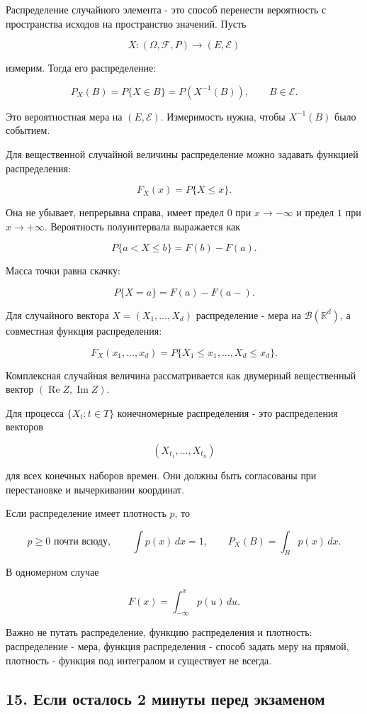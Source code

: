 \documentclass[
  11pt,
  a4paper,
]{article}
\begin{document}
Распределение случайного элемента - это способ перенести вероятность с
пространства исходов на пространство значений. Пусть

\[
X:(\Omega,\mathcal F,P)\to(E,\mathcal E)
\]

измерим. Тогда его распределение:

\[
P_X(B)=P\{X\in B\}=P(X^{-1}(B)),\qquad B\in\mathcal E.
\]

Это вероятностная мера на \((E,\mathcal E)\). Измеримость нужна, чтобы
\(X^{-1}(B)\) было событием.

Для вещественной случайной величины распределение можно задавать
функцией распределения:

\[
F_X(x)=P\{X\le x\}.
\]

Она не убывает, непрерывна справа, имеет предел \(0\) при
\(x\to-\infty\) и предел \(1\) при \(x\to+\infty\). Вероятность
полуинтервала выражается как

\[
P\{a<X\le b\}=F(b)-F(a).
\]

Масса точки равна скачку:

\[
P\{X=a\}=F(a)-F(a-).
\]

Для случайного вектора \(X=(X_1,\ldots,X_d)\) распределение - мера на
\(\mathcal B(\mathbb R^d)\), а совместная функция распределения:

\[
F_X(x_1,\ldots,x_d)
=
P\{X_1\le x_1,\ldots,X_d\le x_d\}.
\]

Комплексная случайная величина рассматривается как двумерный
вещественный вектор \((\operatorname{Re}Z,\operatorname{Im}Z)\).

Для процесса \(\{X_t:t\in T\}\) конечномерные распределения - это
распределения векторов

\[
(X_{t_1},\ldots,X_{t_n})
\]

для всех конечных наборов времен. Они должны быть согласованы при
перестановке и вычеркивании координат.

Если распределение имеет плотность \(p\), то

\[
p\ge0\text{ почти всюду},\qquad
\int p(x)\,dx=1,\qquad
P_X(B)=\int_Bp(x)\,dx.
\]

В одномерном случае

\[
F(x)=\int_{-\infty}^{x}p(u)\,du.
\]

Важно не путать распределение, функцию распределения и плотность:
распределение - мера, функция распределения - способ задать меру на
прямой, плотность - функция под интегралом и существует не всегда.

\subsection{15. Если осталось 2 минуты перед
экзаменом}\label{ux435ux441ux43bux438-ux43eux441ux442ux430ux43bux43eux441ux44c-2-ux43cux438ux43dux443ux442ux44b-ux43fux435ux440ux435ux434-ux44dux43aux437ux430ux43cux435ux43dux43eux43c}
\end{document}
